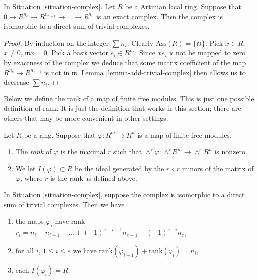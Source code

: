 \begin{lemma}
\label{lemma-exact-artinian-local}
In Situation \ref{situation-complex}.
Let $R$ be a Artinian local ring.
Suppose that $0 \to R^{n_e} \to R^{n_{e-1}}
\to \ldots \to R^{n_0}$ is an exact complex.
Then the complex is isomorphic to a direct sum of
trivial complexes.
\end{lemma}

\begin{proof}
By induction on the integer $\sum n_i$.
Clearly $\text{Ass}(R) = \{\mathfrak m\}$.
Pick $x \in R$, $x \not = 0$, $\mathfrak m x = 0$.
Pick a basis vector $e_i \in R^{n_e}$.
Since $xe_i$ is not be mapped to zero by
exactness of the complex we deduce that some matrix
coefficient of the map $R^{n_e} \to R^{n_{e-1}}$
is not in $\mathfrak m$.
Lemma \ref{lemma-add-trivial-complex} then allows
us to decrease $\sum n_i$.
\end{proof}

\noindent
Below we define the rank of a map of finite free modules.
This is just one possible definition of rank. It
is just the definition that works in this section; there
are others that may be more convenient in other settings.

\begin{definition}
\label{definition-rank}
Let $R$ be a ring. Suppose that $\varphi : R^m \to R^n$ is a map
of finite free modules.
\begin{enumerate}
\item The {\it rank} of $\varphi$ is the maximal $r$ such that
$\wedge^r \varphi : \wedge^r R^m \to \wedge^r R^n$ is nonzero.
\item We let $I(\varphi) \subset R$ be the ideal generated by
the $r\times r$ minors of the matrix of $\varphi$, where $r$
is the rank as defined above.
\end{enumerate}
\end{definition}

\begin{lemma}
\label{lemma-trivial-case-exact}
In Situation \ref{situation-complex}, suppose the complex is
isomorphic to a direct sum of trivial complexes. Then
we have
\begin{enumerate}
\item the maps $\varphi_i$ have rank
$r_i = n_i - n_{i + 1} + \ldots + (-1)^{e-i-1} n_{e-1} + (-1)^{e-i} n_e$,
\item for all $i$, $1 \leq i \leq e$ we have
$\text{rank}(\varphi_{i + 1}) + \text{rank}(\varphi_i) = n_i$,
\item each $I(\varphi_i) = R$.
\end{enumerate}
\end{lemma}


